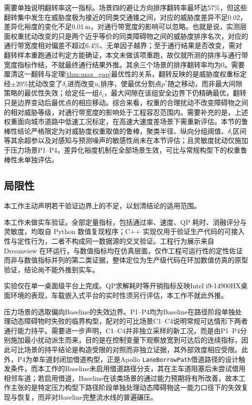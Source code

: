 \documentclass[a4paper,11pt]{ctexart}
\theoremstyle{definition}
\begin{document}
需要单独说明翻转率这一指标。场景四的避让方向排序翻转率最坏达57\%，但这些翻转集中发生在威胁度极为接近的同类交通锥之间，对应的威胁度差异不足0.02，差异化裕度的变化不足0.01\,m，对通行带宽度的影响可以忽略。也就是说，实测层面权重扰动改变的只是两个近乎等价的同类障碍物之间的威胁度排序名次，对应的通行带宽度相对偏差不超过6.4\%、无单因子越界；至于通行结果是否改变，需对翻转样本重跑通过判定方能确证，本文未做该项重跑，故仅就所测的排序与通行带宽度指标作结，不就最终通行结果外推。其余三个场景的排序翻转率均为0。需要厘清这一翻转与定理\ref{thm:max_gap}最优性的关系，翻转反映的是威胁度权重标定经$\pm20\%$扰动改变了$\delta_i$进而改变$u_i$排序，使最优分割点$p^{*}$随之移动，而非最大间隙策略的最优性失效；给定任一组$\delta_i$，最大间隙在该组安全边界下仍精确最优，翻转只是边界变动后最优点的相应移动。综合来看，权重的合理扰动不改变障碍物之间的相对威胁等级，对通行带宽度的影响处于工程容忍范围内。需要补充的是，上述权重面向城市道路中低速工况标定，在高速大速度差场景下需重新评估。本节的鲁棒性结论严格限定为对威胁度权重取值的鲁棒，聚类半径、纵向分组阈值、$\delta_i$区间等其余超参以及对感知与预测噪声的敏感性尚未在本节评估；且灵敏度扰动仅施加于压力场景P1--P4，差异化裕度机制在全部场景生效，可比与常规构型下的权重鲁棒性未单独评估。

\subsection{局限性}
\label{subsec:exp_limitations}

本工作主动声明若干验证边界上的不足，以划清结论的适用范围。

本工作未做实车验证。全部定量指标，包括通过率、速度、QP 耗时、消融评分与灵敏度，均取自 Python 数值复现程序；C++ 实现仅用于验证生产代码的可接入性与定性行为，二者不构成同一数据源的交叉验证。工程行为展示来自 Dreamview 在环运行，与数值指标均在仿真层面，仅作工程可运行性的定性佐证而非与数值指标并列的第二类证据，整体定位为生产级代码在环加数值仿真的原型验证，结论尚不能外推到实车。

实验仅在单一桌面级平台上完成。QP求解耗时等开销指标反映Intel i9-14900HX桌面环境的表现，车载嵌入式平台的实时性须另行评估，本工作不就此外推。

压力场景的选取偏向Baseline的失效边界。P1--P4均为Baseline在路径阶段单独处理动态障碍物时失败的临界构型，配对的可比场景C1--C4说明常规可达情形下两者通行能力持平。需要进一步声明，C1--C4并非独立采样的新工况，而是由P1--P4分别施加最小扰动派生而来，目的是在控制变量下观察放宽到可达后的连续指标，因此可比场景的持平结论是构造受限的对照而非独立证据，其外部效度相应受限。此外，P4为单车道封闭加借道构型，正是Apollo \texttt{LaneBorrowPath}借道路径的设计触发条件，而本工作的Baseline未启用借道路径分支，其在主车道阻塞后未尝试借用相邻车道；若启用借道，Baseline在该类场景的通过能力预期将有所改善，故本工作主张的是特定压力构型下路径阶段单独处理动态障碍物这一能力口径下的失效复现与恢复，而非对Baseline完整流水线的普遍碾压。
\end{document}
